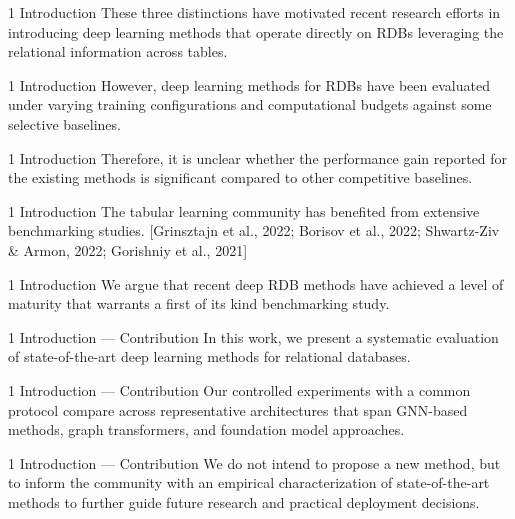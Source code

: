 \documentclass[aspectratio=169,10pt]{beamer}
\newcommand{\cit}[1]{{\scriptsize\color{gray}[#1]}}
\begin{document}
\begin{frame}{1 Introduction}
These three distinctions have motivated recent research efforts in introducing deep learning methods that operate directly on RDBs leveraging the relational information across tables.
\end{frame}

\begin{frame}{1 Introduction}
However, deep learning methods for RDBs have been evaluated under varying training configurations and computational budgets against some selective baselines.
\end{frame}

\begin{frame}{1 Introduction}
Therefore, it is unclear whether the performance gain reported for the existing methods is significant compared to other competitive baselines.
\end{frame}

\begin{frame}{1 Introduction}
The tabular learning community has benefited from extensive benchmarking studies.
\cit{Grinsztajn et al., 2022; Borisov et al., 2022; Shwartz-Ziv \& Armon, 2022; Gorishniy et al., 2021}
\end{frame}

\begin{frame}{1 Introduction}
We argue that recent deep RDB methods have achieved a level of maturity that warrants a first of its kind benchmarking study.
\end{frame}

\begin{frame}{1 Introduction --- Contribution}
In this work, we present a systematic evaluation of state-of-the-art deep learning methods for relational databases.
\end{frame}

\begin{frame}{1 Introduction --- Contribution}
Our controlled experiments with a common protocol compare across representative architectures that span GNN-based methods, graph transformers, and foundation model approaches.
\end{frame}

\begin{frame}{1 Introduction --- Contribution}
We do not intend to propose a new method, but to inform the community with an empirical characterization of state-of-the-art methods to further guide future research and practical deployment decisions.
\end{frame}
\end{document}
